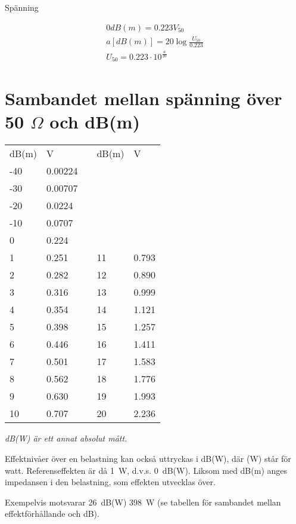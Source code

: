 Spänning

\begin{gather*}
  0 dB(m) = 0.223 V_{50} \\
  a [dB(m)] = 20 \log\frac{U_{50}}{0.223} \\
  U_{50} = 0.223 \cdot 10^{\frac{a}{20}}
\end{gather*}

\section{Sambandet mellan spänning över 50 \(\Omega\) och dB(m)}
\begin{tabular}{l|lp{1cm}l|l}
  dB(m) & V & & dB(m) & V \\
  \cline{1-2} \cline{4-5}
  -40 & 0.00224 & & & \\
  -30 & 0.00707 & & & \\
  -20 & 0.0224  & & & \\
  -10 & 0.0707  & & & \\
  0   & 0.224   & & & \\
  1   & 0.251   & & 11 & 0.793 \\
  2   & 0.282   & & 12 & 0.890 \\
  3   & 0.316   & & 13 & 0.999 \\
  4   & 0.354   & & 14 & 1.121 \\
  5   & 0.398   & & 15 & 1.257 \\
  6   & 0.446   & & 16 & 1.411 \\
  7   & 0.501   & & 17 & 1.583 \\
  8   & 0.562   & & 18 & 1.776 \\
  9   & 0.630   & & 19 & 1.993 \\
  10  & 0.707   & & 20 & 2.236 \\
\end{tabular}

\emph{dB(W) är ett annat absolut mått.}

Effektnivåer över en belastning kan också uttryckas i dB(W), där (W)
står för watt.  Referenseffekten är då 1~W, d.v.s. 0~dB(W).  Liksom med
dB(m) anges impedansen i den belastning, som effekten utvecklas över.

Exempelvis motsvarar 26~dB(W) 398~W (se tabellen för sambandet mellan
effektförhållande och dB).
